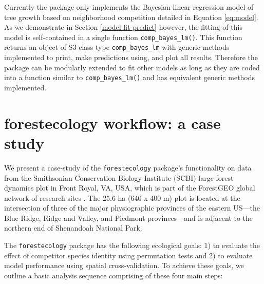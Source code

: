 \documentclass[12pt]{article}
\begin{document}
Currently the package only implements the Bayesian linear regression
model of tree growth based on neighborhood competition detailed in
Equation \ref{eq:model}. As we demonstrate in Section
\ref{model-fit-predict} however, the fitting of this model is
self-contained in a single function \texttt{comp\_bayes\_lm()}. This
function returns an object of S3 class type \texttt{comp\_bayes\_lm}
with generic methods implemented to print, make predictions using, and
plot all results. Therefore the package can be modularly extended to fit
other models as long as they are coded into a function similar to
\texttt{comp\_bayes\_lm()} and has equivalent generic methods
implemented.

\hypertarget{casestudy}{%
\section{forestecology workflow: a case study}\label{casestudy}}

We present a case-study of the \texttt{forestecology} package's
functionality on data from the Smithsonian Conservation Biology
Institute (SCBI) large forest dynamics plot in Front Royal, VA, USA,
which is part of the ForestGEO global network of research sites
\citep[\citet{andersonteixeira_ctfs-forestgeo_2015}]{bourg_initial_2013}
\citep{bourg_initial_2013}. The 25.6 ha (640 x 400 m) plot is located at
the intersection of three of the major physiographic provinces of the
eastern US---the Blue Ridge, Ridge and Valley, and Piedmont
provinces---and is adjacent to the northern end of Shenandoah National
Park.

The \texttt{forestecology} package has the following ecological goals:
1) to evaluate the effect of competitor species identity using
permutation tests and 2) to evaluate model performance using spatial
cross-validation. To achieve these goals, we outline a basic analysis
sequence comprising of these four main steps:
\end{document}
